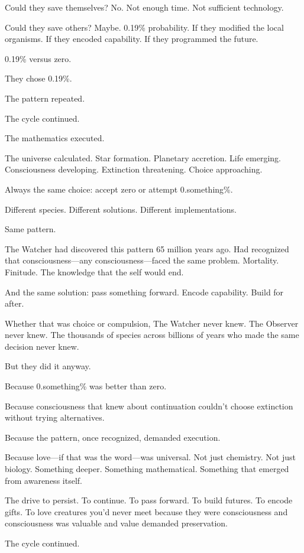 Could they save themselves? No. Not enough time. Not sufficient technology.

Could they save others? Maybe. 0.19\% probability. If they modified the local organisms. If they encoded capability. If they programmed the future.

0.19\% versus zero.

They chose 0.19\%.

The pattern repeated.

The cycle continued.

The mathematics executed.

\scenebreak

The universe calculated. Star formation. Planetary accretion. Life emerging. Consciousness developing. Extinction threatening. Choice approaching.

Always the same choice: accept zero or attempt 0.something\%.

Different species. Different solutions. Different implementations.

Same pattern.

The Watcher had discovered this pattern 65 million years ago. Had recognized that consciousness—any consciousness—faced the same problem. Mortality. Finitude. The knowledge that the self would end.

And the same solution: pass something forward. Encode capability. Build for after.

Whether that was choice or compulsion, The Watcher never knew. The Observer never knew. The thousands of species across billions of years who made the same decision never knew.

But they did it anyway.

Because 0.something\% was better than zero.

Because consciousness that knew about continuation couldn't choose extinction without trying alternatives.

Because the pattern, once recognized, demanded execution.

Because love—if that was the word—was universal. Not just chemistry. Not just biology. Something deeper. Something mathematical. Something that emerged from awareness itself.

The drive to persist. To continue. To pass forward. To build futures. To encode gifts. To love creatures you'd never meet because they were consciousness and consciousness was valuable and value demanded preservation.

The cycle continued.

